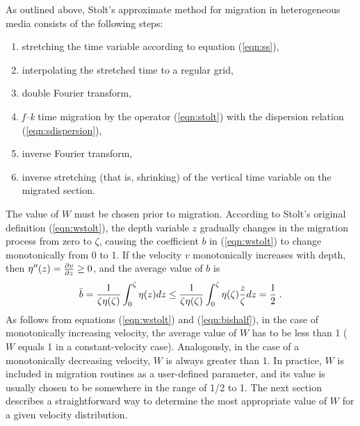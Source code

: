 As outlined above, Stolt's approximate method for migration in
heterogeneous media consists of the following steps:
\begin{enumerate}
\item stretching the time variable according to equation
  (\ref{eqn:ss}),
\item interpolating the stretched time to a regular grid,
\item double Fourier transform,
\item {\em f--k} time migration by the operator (\ref{eqn:stolt}) with
  the dispersion relation (\ref{eqn:sdispersion}),
\item inverse Fourier transform,
\item inverse stretching (that is, shrinking) of the vertical time
  variable on the migrated section.
\end{enumerate}
The value of $W$ must be chosen prior to migration. According to
Stolt's original definition (\ref{eqn:wstolt}), 
the depth variable $z$ gradually changes in the migration process from
zero to $\zeta$, causing the coefficient
$b$ in (\ref{eqn:wstolt}) to change monotonically from 0 to 1. If the velocity $v$ 
monotonically increases with depth, then 
$\eta''(z)={\partial v \over \partial z}\geq 0$, and the average value of $b$ is
\begin{equation}
\bar{b}={1 \over {\zeta \eta(\zeta)}}\, {\int_0^\zeta \eta(z) dz}\leq
{1 \over {\zeta \eta(\zeta)}}\, {\int_0^\zeta {\eta(\zeta) {z \over \zeta} }dz}=
{1 \over 2}\;.
\label{eqn:bishalf} 
\end{equation} 
As follows from equations (\ref{eqn:wstolt}) and (\ref{eqn:bishalf}),
in the case of monotonically increasing velocity, the average value of
$W$ has to be less than 1 ($W$ equals 1 in a constant-velocity case).
Analogously, in the case of a monotonically decreasing velocity, $W$
is always greater than 1.  In practice, $W$ is included in migration
routines as a user-defined parameter, and its value is usually chosen
to be somewhere in the range of 1/2 to 1. The next section describes a
straightforward way to determine the most appropriate value of $W$ for
a given velocity distribution.



